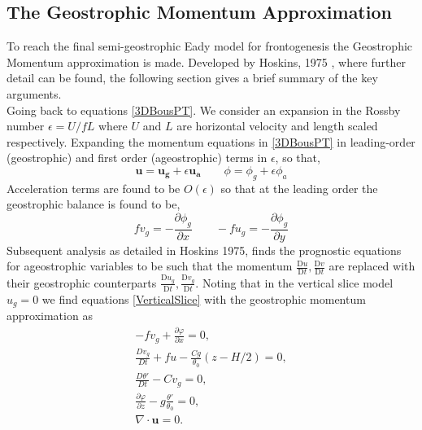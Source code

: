 \subsection{The Geostrophic Momentum Approximation}
To reach the final semi-geostrophic Eady model for frontogenesis the Geostrophic Momentum approximation is made. Developed by Hoskins, 1975 \cite{Hoskins1975}, where further detail can be found, the following section gives a brief summary of the key arguments.\\
\linebreak
Going back to equations \ref{3DBousPT}. We consider an expansion in the Rossby number $\epsilon = U/fL$ where $U$ and $L$ are horizontal velocity and length scaled respectively. Expanding the momentum equations in \ref{3DBousPT} in leading-order (geostrophic) and first order (ageostrophic) terms in $\epsilon$, so that,
\begin{equation*}
	\bm{u} = \bm{u_g} + \epsilon \bm{u_a} \qquad \phi = \phi_g +\epsilon \phi_a
\end{equation*}
Acceleration terms are found to be $O(\epsilon)$ so that at the leading order the geostrophic balance is found to be,
\begin{equation}
	fv_g  = -\frac{\partial \phi_g}{\partial x} \qquad
	-fu_g  = -\frac{\partial \phi_g}{\partial y}
\end{equation}
Subsequent analysis as detailed in Hoskins 1975, \cite{Hoskins1975} finds the prognostic equations for ageostrophic variables to be such that the momentum $\frac{\mathrm{D}u}{\mathrm{D}t}, \frac{\mathrm{D}v}{\mathrm{D}t}$ are replaced with their geostrophic counterparts $\frac{\mathrm{D}u_g}{\mathrm{D}t}, \frac{\mathrm{D}v_g}{\mathrm{D}t}$. Noting that in the vertical slice model $u_g = 0$ we find equations \ref{VerticalSlice} with the geostrophic momentum approximation as
\begin{equation}
	\begin{aligned}
		-fv_g + \frac{\partial \varphi}{\partial x} = 0,\\
		\frac{Dv_g}{Dt} + fu -\frac{Cg}{\theta _0}\left(z-H/2\right) = 0,\\
		\frac{D\theta'}{Dt} - Cv_g = 0,\\
		\frac{\partial \varphi}{\partial z} - g\frac{\theta'}{\theta_0} = 0,\\
		\nabla \cdot \bm{u} = 0.
	\end{aligned}
\label{EadyModel}
\end{equation}
